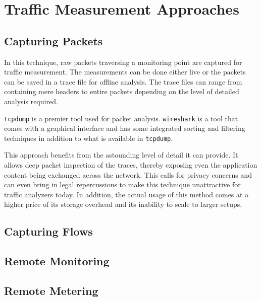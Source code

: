 \chapter{Traffic Measurement Approaches}\label{ch:traffic-measurement-approaches}

\section{Capturing Packets}\label{sec:capturing-packets}
In this technique, raw packets traversing a monitoring point are captured for traffic measurement. The measurements can be done either live or the packets can be saved in a trace file for offline analysis. The trace files can range from containing mere headers to entire packets depending on the level of detailed analysis required. 

\texttt{tcpdump} \cite{... } is a premier tool used for packet analysis. \texttt{wireshark} \cite{...} is a  tool that comes with a graphical interface and has some integrated sorting and filtering techniques in addition to what is available in \texttt{tcpdump}. 

This approach benefits from the astounding level of detail it can provide. It allows deep packet inspection of the traces, thereby exposing even the application content being exchanged  across the network. This calls for privacy concerns and can even bring in legal repercussions to make this technique unattractive for traffic analyzers today. In addition, the actual usage of this method comes at a higher price of its storage overhead and its inability to scale to larger setups.



\section{Capturing Flows}\label{sec:capturing-flows}



\section{Remote Monitoring}\label{sec:remote-monitoring}
\section{Remote Metering}\label{sec:remote-metering}
